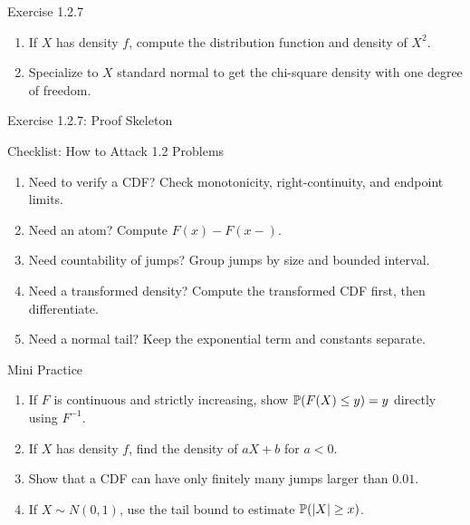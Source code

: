 \begin{frame}{Exercise 1.2.7}
  \begin{enumerate}
    \item[(i)] If $X$ has density $f$, compute the distribution function and density of $X^2$.
    \item[(ii)] Specialize to $X$ standard normal to get the chi-square density with one degree of freedom.
  \end{enumerate}
\end{frame}

\begin{frame}{Exercise 1.2.7: Proof Skeleton}
\end{frame}

\begin{frame}{Checklist: How to Attack 1.2 Problems}
  \begin{enumerate}
    \item Need to verify a CDF? Check monotonicity, right-continuity, and endpoint limits.
    \item Need an atom? Compute $F(x)-F(x-)$.
    \item Need countability of jumps? Group jumps by size and bounded interval.
    \item Need a transformed density? Compute the transformed CDF first, then differentiate.
    \item Need a normal tail? Keep the exponential term and constants separate.
  \end{enumerate}
\end{frame}

\begin{frame}{Mini Practice}
  \begin{enumerate}
    \item If $F$ is continuous and strictly increasing, show $\mathbb{P}(F(X)\le y)=y$ directly using $F^{-1}$.
    \item If $X$ has density $f$, find the density of $aX+b$ for $a<0$.
    \item Show that a CDF can have only finitely many jumps larger than $0.01$.
    \item If $X\sim N(0,1)$, use the tail bound to estimate $\mathbb{P}(|X|\ge x)$.
  \end{enumerate}
\end{frame}


